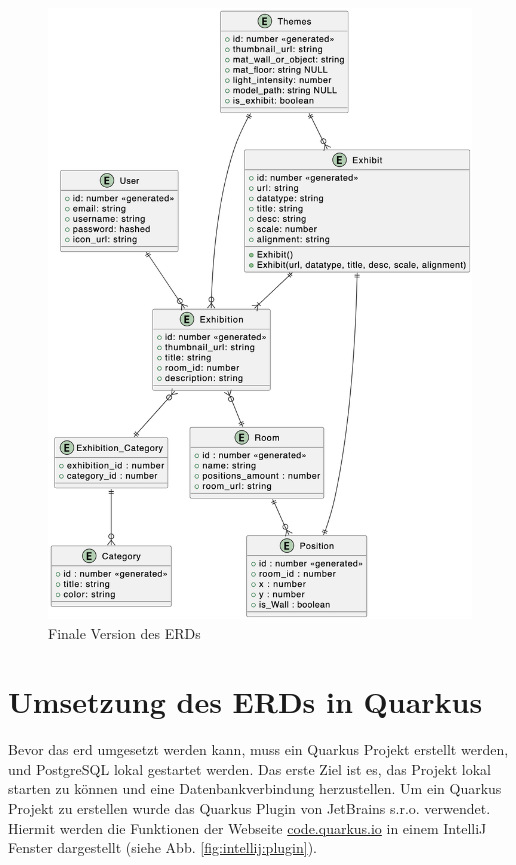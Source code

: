 \begin{figure}
    \centering
    \includegraphics[scale=0.5]{pics/lastversion_erd.png}
    \caption{Finale Version des ERDs}
    \label{fig:erd:lastversion}
\end{figure}

\section{Umsetzung des ERDs in Quarkus}
Bevor das \gls{erd} umgesetzt werden kann, muss ein Quarkus Projekt erstellt werden, und PostgreSQL lokal gestartet werden. 
Das erste Ziel ist es, das Projekt lokal starten zu können und eine Datenbankverbindung herzustellen. 
Um ein Quarkus Projekt zu erstellen wurde das Quarkus Plugin von JetBrains s.r.o. verwendet. 
Hiermit werden die Funktionen der Webseite \href{https://code.quarkus.io}{code.quarkus.io} in einem IntelliJ Fenster dargestellt (siehe Abb. \ref{fig:intellij:plugin}). 

